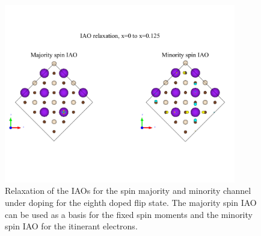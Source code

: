 \documentclass{article}
\begin{document}
\begin{figure}[H]
\centering
\includegraphics[width=0.9\textwidth]{Figures/R3-iao_basis.pdf}
\caption{\label{fig5} Relaxation of the IAOs for the spin majority and minority channel under doping for the eighth doped flip state. The majority spin IAO can be used as a basis for the fixed spin moments and the minority spin IAO for the itinerant electrons.}
\end{figure}

 
\end{document}
